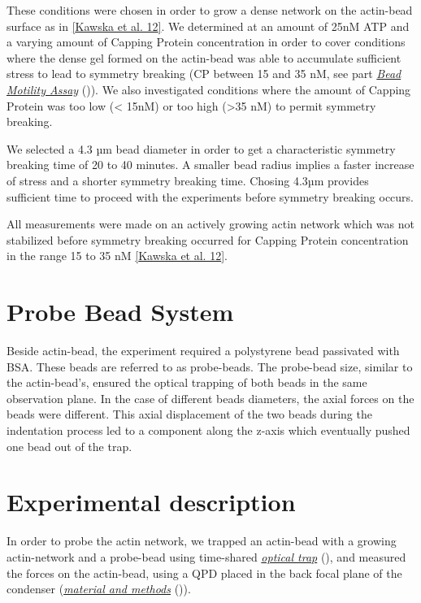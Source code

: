 \documentclass[A4paperpaper,11pt,english]{sphinxmanual}
\begin{document}
These conditions were chosen in order to grow a dense network on the actin-bead surface as in {\hyperref[index-latex:kawska2012]{{[}Kawska et al. 12{]}}}. We determined at an amount of 25nM ATP and a varying
amount of Capping Protein concentration in order to cover conditions where the
dense gel formed on the actin-bead was able to accumulate sufficient stress
to lead to symmetry breaking (CP between 15  and 35 nM, see part {\hyperref[index-latex:bead-motility-assay]{\emph{Bead Motility Assay}}} ()). We also investigated
conditions where the amount of Capping Protein was too low (\textless{} 15nM) or too high
(\textgreater{}35 nM) to permit symmetry breaking.

We selected a 4.3 µm bead diameter in order to get a characteristic symmetry
breaking time of 20 to 40 minutes.
A smaller bead radius implies a
faster increase of stress and a shorter symmetry breaking time.
Chosing 4.3µm provides sufficient time to proceed with the
experiments before symmetry breaking occurs.

All measurements were made on an actively growing actin network which
was not stabilized before symmetry breaking
occurred for Capping Protein concentration in the range 15 to 35 nM {\hyperref[index-latex:kawska2012]{{[}Kawska et al. 12{]}}}.


\section{Probe Bead System}
\label{index-latex:probe-bead-system}
Beside actin-bead, the experiment required a polystyrene bead passivated
with BSA. These beads are referred to as probe-beads.  The probe-bead size, similar to the actin-bead’s, ensured the optical
trapping of both beads in the same observation plane. In the case of different beads diameters, the axial forces on the beads were different. This axial
displacement of the two beads during the indentation process led to a
component along the z-axis which  eventually pushed one bead out of the trap.


\section{Experimental description}
\label{index-latex:experimental-description}
In order to probe the actin network, we trapped an actin-bead with a growing actin-network
and a probe-bead using time-shared {\hyperref[index-latex:time-shared-ot]{\emph{optical trap}}} (),  and
measured the forces on the actin-bead, using a QPD placed in the back focal plane of
the condenser ({\hyperref[index-latex:m-et-m]{\emph{material and methods}}} ()).
\end{document}
